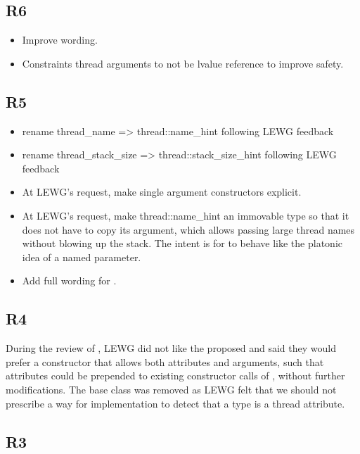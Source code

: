 \documentclass{wg21}
\begin{document}
\subsection{R6}

\begin{itemize}
\item Improve wording.
\item Constraints thread arguments to not be lvalue reference to improve safety.
\end{itemize}

\subsection{R5}

\begin{itemize}
\item rename thread_name => thread::name_hint following LEWG feedback
\item rename thread_stack_size => thread::stack_size_hint following LEWG feedback
\item At LEWG's request, make single argument constructors explicit.
\item At LEWG's request, make thread::name_hint an immovable type so that it does not have to copy its argument, which allows passing large thread names without blowing up the stack.
      The intent is for  to behave like the platonic idea of a named parameter.
\item Add full wording for .
\end{itemize}

\subsection{R4}

During the review of , LEWG did not like the proposed  and said they would prefer a constructor
that allows both attributes and arguments, such that attributes could be prepended to existing constructor calls of , without further modifications.
The  base class was removed as LEWG felt that we should not prescribe a way for implementation to detect that a type is a thread attribute.

\subsection{R3}
\end{document}
